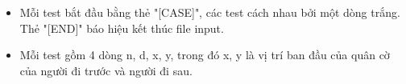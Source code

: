\begin{itemize}
	\item     Mỗi test bắt đầu bằng thẻ "[CASE]", các test cách nhau bởi một dòng trắng. Thẻ "[END]" báo hiệu kết thúc file input.   
	\item     Mỗi test gồm 4 dòng n, d, x, y, trong đó x, y là vị trí ban đầu của quân cờ của người đi trước và người đi sau.   
\end{itemize}